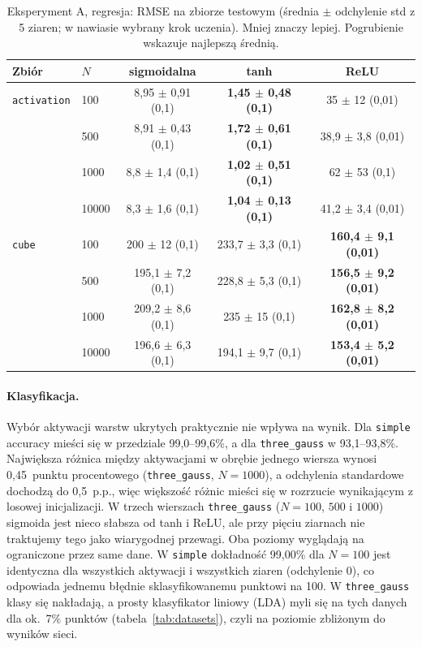 \documentclass[11pt,a4paper]{article}
\begin{document}
	\begin{table}[H]
		\centering
		\small
		\caption{Eksperyment A, regresja: RMSE na zbiorze testowym (średnia $\pm$ odchylenie std z 5 ziaren; w nawiasie wybrany krok uczenia). Mniej znaczy lepiej. Pogrubienie wskazuje najlepszą średnią.}\label{tab:A_reg}
		\begin{tabular}{@{}llccc@{}}
			\toprule
			Zbiór & $N$ & sigmoidalna & tanh & ReLU \\
			\midrule
			\texttt{activation} & 100 & 8,95 $\pm$ 0,91 (0,1) & \textbf{1,45 $\pm$ 0,48 (0,1)} & 35 $\pm$ 12 (0,01) \\
			& 500 & 8,91 $\pm$ 0,43 (0,1) & \textbf{1,72 $\pm$ 0,61 (0,1)} & 38,9 $\pm$ 3,8 (0,01) \\
			& 1000 & 8,8 $\pm$ 1,4 (0,1) & \textbf{1,02 $\pm$ 0,51 (0,1)} & 62 $\pm$ 53 (0,1) \\
			& 10000 & 8,3 $\pm$ 1,6 (0,1) & \textbf{1,04 $\pm$ 0,13 (0,1)} & 41,2 $\pm$ 3,4 (0,01) \\
			\midrule
			\texttt{cube} & 100 & 200 $\pm$ 12 (0,1) & 233,7 $\pm$ 3,3 (0,1) & \textbf{160,4 $\pm$ 9,1 (0,01)} \\
			& 500 & 195,1 $\pm$ 7,2 (0,1) & 228,8 $\pm$ 5,3 (0,1) & \textbf{156,5 $\pm$ 9,2 (0,01)} \\
			& 1000 & 209,2 $\pm$ 8,6 (0,1) & 235 $\pm$ 15 (0,1) & \textbf{162,8 $\pm$ 8,2 (0,01)} \\
			& 10000 & 196,6 $\pm$ 6,3 (0,1) & 194,1 $\pm$ 9,7 (0,1) & \textbf{153,4 $\pm$ 5,2 (0,01)} \\
			\bottomrule
		\end{tabular}
	\end{table}
	
	\paragraph{Klasyfikacja.} Wybór aktywacji warstw ukrytych praktycznie nie wpływa na wynik. Dla \texttt{simple} accuracy mieści się w przedziale 99,0--99,6\%, a dla \texttt{three\_gauss} w 93,1--93,8\%. Największa różnica między aktywacjami w obrębie jednego wiersza wynosi 0,45~punktu procentowego (\texttt{three\_gauss}, $N=1000$), a odchylenia standardowe dochodzą do 0,5~p.p., więc większość różnic mieści się w rozrzucie wynikającym z losowej inicjalizacji. W trzech wierszach \texttt{three\_gauss} ($N=100$, $500$ i $1000$) sigmoida jest nieco słabsza od tanh i ReLU, ale przy pięciu ziarnach nie traktujemy tego jako wiarygodnej przewagi.
	Oba poziomy wyglądają na ograniczone przez same dane. W \texttt{simple} dokładność 99,00\% dla $N=100$ jest identyczna dla wszystkich aktywacji i wszystkich ziaren (odchylenie 0), co odpowiada jednemu błędnie sklasyfikowanemu punktowi na 100. W \texttt{three\_gauss} klasy się nakładają, a prosty klasyfikator liniowy (LDA) myli się na tych danych dla ok.\ 7\% punktów (tabela~\ref{tab:datasets}), czyli na poziomie zbliżonym do wyników sieci.
	
\end{document}
